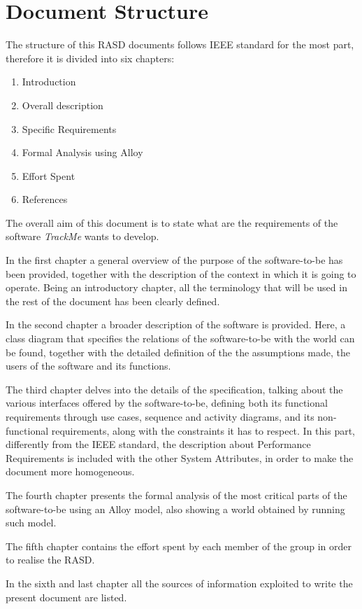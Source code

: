 \section{Document Structure}
    The structure of this RASD documents follows IEEE standard for the most part, therefore it is divided into six chapters:
    \begin{enumerate}
        \item Introduction
        
        \item Overall description
        
        \item Specific Requirements
        
        \item Formal Analysis using Alloy
        
        \item Effort Spent
        
        \item References
    \end{enumerate}
    
The overall aim of this document is to state what are the requirements of the software \emph{TrackMe} wants to develop.
    
    In the first chapter a general overview of the purpose of the software-to-be has been provided, together with the description of the context in which it is going to operate. Being an introductory chapter, all the terminology that will be used in the rest of the document has been clearly defined.
    
    In the second chapter a broader description of the software is provided. Here, a class diagram that specifies the relations of the software-to-be with the world can be found, together with the detailed definition of the the assumptions made, the users of the software and its functions.
    
    The third chapter delves into the details of the specification, talking about the various interfaces offered by the software-to-be, defining both its functional requirements through use cases, sequence and activity diagrams, and its non-functional requirements, along with the constraints it has to respect. In this part, differently from the IEEE standard, the description about Performance Requirements is included with the other System Attributes, in order to make the document more homogeneous.
    
    The fourth chapter presents the formal analysis of the most critical parts of the software-to-be using an Alloy model, also showing a world obtained by running such model.
    
    The fifth chapter contains the effort spent by each member of the group in order to realise the RASD.
    
    In the sixth and last chapter all the sources of information exploited to write the present document are listed.